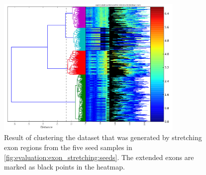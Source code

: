 \documentclass[parskip]{cs4rep}
\begin{document}
\begin{figure}[t,b]
   \centering
   \includegraphics[width=0.8\textwidth]{figures/evaluation/exon_stretching/dgw_cut.png}
   \caption{Result of clustering the dataset that was generated by stretching exon regions from the five seed samples in \autoref{fig:evaluation:exon_stretching:seeds}. The extended exons are marked as black points in the heatmap.}
   \label{fig:evaluation:exon_stretching:cut}
\end{figure}
\end{document}
